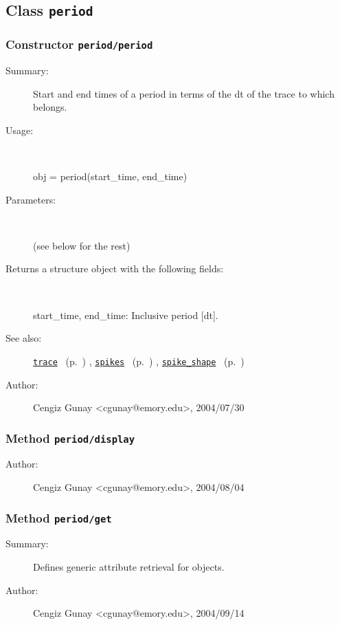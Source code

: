 \subsection{Class \texttt{period}}%
%
\label{ref_period}%
\hypertarget{ref_period}{}%
\subsubsection[Constructor \texttt{period}]{Constructor \texttt{period/period}}%
%
\label{ref_period__period}%
\hypertarget{ref_period__period}{}%
\begin{description}
\item[Summary:]Start and end times of a period in terms of the dt of the trace
	to which belongs.
%
\item[Usage:]~%
\begin{lyxcode}%
obj = period(start\_time, end\_time)
%
\end{lyxcode}%
%
%
\item[Parameters:]~

(see below for the rest)%
\item[Returns a structure object with the following fields:]~

	start\_time, end\_time: Inclusive period [dt].
%
%
\item[See also:]%
\hyperlink{ref_trace}{\texttt{trace}}%
\ (p.~\pageref{ref_trace})%
%
, \hyperlink{ref_spikes}{\texttt{spikes}}%
\ (p.~\pageref{ref_spikes})%
%
, \hyperlink{ref_spike_shape}{\texttt{spike\_shape}}%
\ (p.~\pageref{ref_spike_shape})%
%
%
\item[Author:]%
Cengiz Gunay <cgunay@emory.edu>, 2004/07/30%
\end{description}
\methodline%
\subsubsection[Method \texttt{display}]{Method \texttt{period/display}}%
%
\label{ref_period__display}%
\hypertarget{ref_period__display}{}%
\begin{description}
%
%
%
%
%
%
%
\item[Author:]%
Cengiz Gunay <cgunay@emory.edu>, 2004/08/04%
\end{description}
\methodline%
\subsubsection[Method \texttt{get}]{Method \texttt{period/get}}%
%
\label{ref_period__get}%
\hypertarget{ref_period__get}{}%
\begin{description}
\item[Summary:]Defines generic attribute retrieval for objects.
%
%
%
%
%
%
%
\item[Author:]%
Cengiz Gunay <cgunay@emory.edu>, 2004/09/14%
\end{description}
\methodline%
